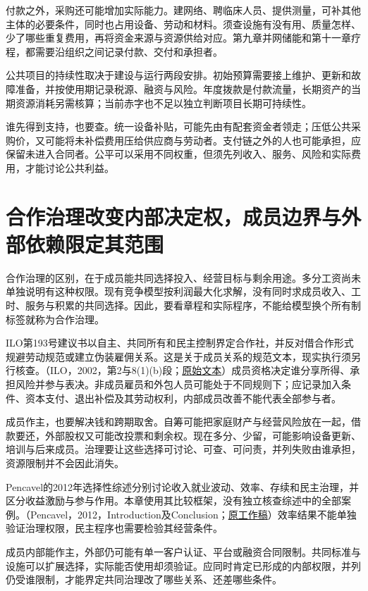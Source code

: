 \documentclass[UTF8,fontset=windows,12pt,a4paper,oneside,openany]{ctexbook}
\begin{document}
付款之外，采购还可能增加实际能力。建网络、聘临床人员、提供测量，可补其他主体的必要条件，同时也占用设备、劳动和材料。须查设施有没有用、质量怎样、少了哪些重复费用，再将资金来源与资源供给对应。第九章并网储能和第十一章疗程，都需要沿组织之间记录付款、交付和承担者。

公共项目的持续性取决于建设与运行两段安排。初始预算需要接上维护、更新和故障准备，并按使用期记录税源、融资与风险。年度拨款是付款流量，长期资产的当期资源消耗另需核算；当前赤字也不足以独立判断项目长期可持续性。

谁先得到支持，也要查。统一设备补贴，可能先由有配套资金者领走；压低公共采购价，又可能将未补偿费用压给供应商与劳动者。支付链之外的人也可能承担，应保留未进入合同者。公平可以采用不同权重，但须先列收入、服务、风险和实际费用，才能讨论公共利益。

\section{合作治理改变内部决定权，成员边界与外部依赖限定其范围}

合作治理的区别，在于成员能共同选择投入、经营目标与剩余用途。多分工资尚未单独说明有这种权限。现有竞争模型按利润最大化求解，没有同时求成员收入、工时、服务与积累的共同选择。因此，要看章程和实际程序，不能给模型换个所有制标签就称为合作治理。

ILO第193号建议书以自主、共同所有和民主控制界定合作社，并反对借合作形式规避劳动规范或建立伪装雇佣关系。这是关于成员关系的规范文本，现实执行须另行核查。（ILO，2002，第2与8(1)(b)段；\href{https://webapps.ilo.org/public/english/standards/relm/ilc/ilc90/pdf/rec-193.pdf}{原始文本}）成员资格决定谁分享所得、承担风险并参与表决。非成员雇员和外包人员可能处于不同规则下；应记录加入条件、资本支付、退出补偿及其劳动权利，内部成员改善不能代表全部参与者。

成员作主，也要解决钱和跨期取舍。自筹可能把家庭财产与经营风险放在一起，借款要还，外部股权又可能改投票和剩余权。现在多分、少留，可能影响设备更新、培训与后来成员。治理要让这些选择可讨论、可查、可问责，并列失败由谁承担，资源限制并不会因此消失。

Pencavel的2012年选择性综述分别讨论收入就业波动、效率、存续和民主治理，并区分收益激励与参与作用。本章使用其比较框架，没有独立核查综述中的全部案例。（Pencavel，2012，Introduction及Conclusion；\href{https://docs.iza.org/dp6932.pdf}{原工作稿}）效率结果不能单独验证治理权限，民主程序也需要检验其经营条件。

成员内部能作主，外部仍可能有单一客户认证、平台或融资合同限制。共同标准与设施可以扩展选择，实际能否使用却须验证。应同时肯定已形成的内部权限，并列仍受谁限制，才能界定共同治理改了哪些关系、还差哪些条件。
\end{document}
